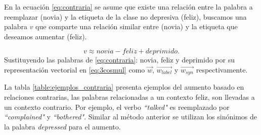 En la ecuación \ref{eq:contraria} se asume que existe una relación entre la palabra a reemplazar (novia) y la etiqueta de la clase no depresiva (feliz), buscamos una palabra $v$ que comparte una relación similar entre (novia) y la etiqueta que deseamos aumentar (feliz).

\begin{equation}
    \label{eq:contraria}
    v \approx novia - feliz + deprimido.
\end{equation}
Sustituyendo las palabras de \ref{eq:contraria}: novia, feliz y deprimido por su representación vectorial en \ref{eq:3cosmul} como $\vec{w}$, $\vec{w_{label}}$ y $\vec{w_{syn}}$ respectivamente.
 

La tabla \ref{table:ejemplos_contraria} presenta ejemplos del aumento basado en relaciones contrarias, las palabras relacionadas a un contexto feliz, son llevadas a un contexto contrario. Por ejemplo, el verbo \textit{``talked"} es reemplazado por \textit{``complained"} y \textit{``bothered"}. Similar al método anterior se utilizan los sinónimos de la palabra \textit{depressed} para el aumento.


